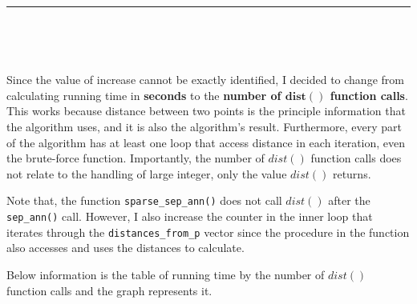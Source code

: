 \documentclass[12pt,english,]{article}
\newcommand{\code}[1]{\colorbox{light-gray}{\texttt{#1}}}
\let\origfigure\figure
\let\endorigfigure\endfigure
\renewenvironment{figure}[1][2] {
    \expandafter\origfigure\expandafter[H]
} {
    \endorigfigure
}
\begin{document}
\begin{figure}
\begin{minipage}{0.95\textwidth}
\begin{center}
\end{center}
\end{minipage}
\caption[Caption]{The graph of ratios $r_n$ versus different values of $n$ of random points on non-Euclidean spaces with $n \in \{2000, 4000, 8000, 16\,000, 32\,000\}$ (with y-scale = $0.5\times10^{-2}$).}
\label{fig:randomgraph}
\end{figure}

\hrule

~

~

Since the value of increase cannot be exactly identified, I decided to
change from calculating running time in \textbf{seconds} to the
\textbf{number of \(\boldsymbol{dist()}\) function calls}. This works
because distance between two points is the principle information that
the algorithm uses, and it is also the algorithm's result. Furthermore,
every part of the algorithm has at least one loop that access distance
in each iteration, even the brute-force function. Importantly, the
number of \(dist()\) function calls does not relate to the handling of
large integer, only the value \(dist()\) returns.

Note that, the function \code{sparse\_sep\_ann()} does not call
\(dist()\) after the \code{sep\_ann()} call. However, I also increase
the counter in the inner loop that iterates through the
\code{distances\_from\_p} vector since the procedure in the function
also accesses and uses the distances to calculate.

Below information is the table of running time by the number of
\(dist()\) function calls and the graph represents it.
\end{document}
